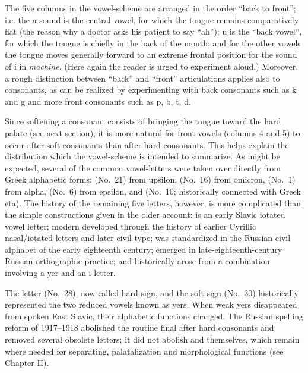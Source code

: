 The five columns in the vowel-scheme are arranged in the order ``back to front''; i.e. the a-sound is the central vowel, for which the tongue remains comparatively flat (the reason why a doctor asks his patient to say ``ah''); u is the ``back vowel'', for which the tongue is chiefly in the back of the mouth; and for the other vowels the tongue moves generally forward to an extreme frontal position for the sound of i in \emph{machine}. (Here again the reader is urged to experiment aloud.) Moreover, a rough distinction between ``back'' and ``front'' articulations applies also to consonants, as can be realized by experimenting with back consonants such as k and g and more front consonants such as p, b, t, d.

Since softening a consonant consists of bringing the tongue toward the hard palate (see next section), it is more natural for front vowels (columns 4 and 5) to occur after soft consonants than after hard consonants. This helps explain the distribution which the vowel-scheme is intended to summarize. As might be expected, several of the common vowel-letters were taken over directly from Greek alphabetic forms:  (No.~21) from upsilon,  (No.~16) from omicron,  (No.~1) from alpha,  (No.~6) from epsilon, and  (No.~10; historically connected with Greek eta). The history of the remaining five letters, however, is more complicated than the simple constructions given in the older account:  is an early Slavic iotated vowel letter; modern  developed through the history of earlier Cyrillic nasal/iotated letters and later civil type;  was standardized in the Russian civil alphabet of the early eighteenth century;  emerged in late-eighteenth-century Russian orthographic practice; and  historically arose from a combination involving a yer and an i-letter.

The letter  (No.~28), now called hard sign, and the soft sign  (No.~30) historically represented the two reduced vowels known as yers. When weak yers disappeared from spoken East Slavic, their alphabetic functions changed. The Russian spelling reform of 1917--1918 abolished the routine final  after hard consonants and removed several obsolete letters; it did not abolish  and  themselves, which remain where needed for separating, palatalization and morphological functions (see Chapter II).

